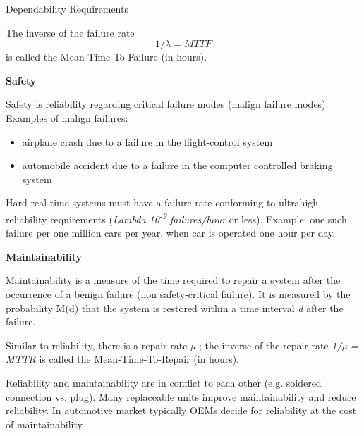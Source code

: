\begin{frame}{Dependability Requirements}

The inverse of the failure rate $${1/\lambda = MTTF}$$ is called the
Mean-Time-To-Failure (in hours).

\textbf{Safety}

Safety is reliability regarding critical failure modes (malign failure
modes). Examples of malign failures:

\begin{itemize}
\item
  airplane crash due to a failure in the flight-control system
\item
  automobile accident due to a failure in the computer controlled
  braking system
\end{itemize}

Hard real-time systems must have a failure rate conforming to ultrahigh
reliability requirements (\emph{Lambda 10\textsuperscript{-9}
failures/hour} or less). Example: one such failure per one million cars
per year, when car is operated one hour per day.

\textbf{Maintainability}

Maintainability is a measure of the time required to repair a system
after the occurrence of a benign failure (non safety-critical failure).
It is measured by the probability M(d) that the system is restored
within a time interval \emph{d} after the failure.

Similar to reliability, there is a repair rate \emph{µ} ; the inverse of
the repair rate \emph{1/µ = MTTR} is called the Mean-Time-To-Repair (in
hours).

Reliability and maintainability are in conflict to each other (e.g.
soldered connection vs. plug). Many replaceable units improve
maintainability and reduce reliability. In automotive market typically
OEMs decide for reliability at the cost of maintainability.

\end{frame}

